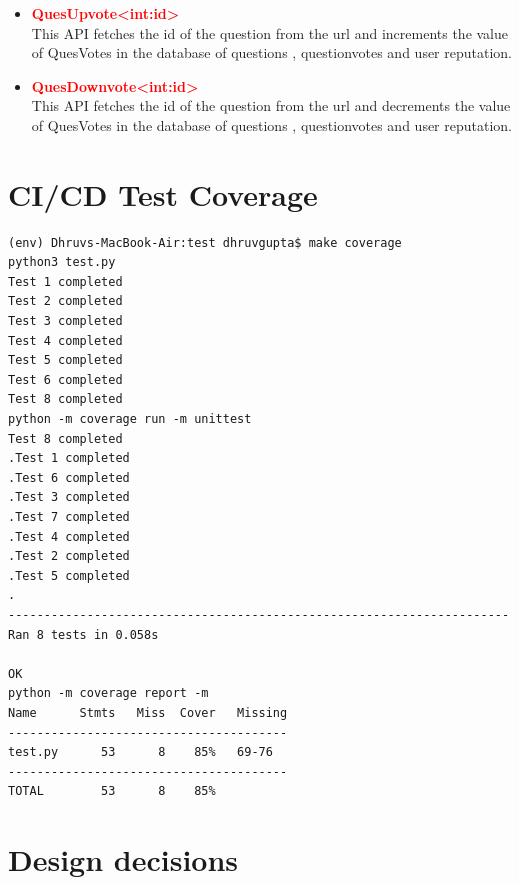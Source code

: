\documentclass{article}
\begin{document}
\begin{itemize}
\begin{itemize}
        \item \textcolor{red}{\textbf{\textfractionsolidus QuesUpvote\textfractionsolidus \textless int:id\textgreater }} \\ This API fetches the id of the question from the url and increments the value of QuesVotes in the database of questions , questionvotes and user reputation.
        \item \textcolor{red}{\textbf{\textfractionsolidus QuesDownvote\textfractionsolidus \textless int:id\textgreater }} \\ This API fetches the id of the question from the url and decrements the value of QuesVotes in the database of questions , questionvotes and user reputation.
    \end{itemize}
    
    
\end{itemize}
\section{CI/CD Test Coverage}
\begin{lstlisting}
(env) Dhruvs-MacBook-Air:test dhruvgupta$ make coverage
python3 test.py
Test 1 completed
Test 2 completed
Test 3 completed
Test 4 completed
Test 5 completed
Test 6 completed
Test 8 completed
python -m coverage run -m unittest
Test 8 completed
.Test 1 completed
.Test 6 completed
.Test 3 completed
.Test 7 completed
.Test 4 completed
.Test 2 completed
.Test 5 completed
.
----------------------------------------------------------------------
Ran 8 tests in 0.058s

OK
python -m coverage report -m
Name      Stmts   Miss  Cover   Missing
---------------------------------------
test.py      53      8    85%   69-76
---------------------------------------
TOTAL        53      8    85%
\end{lstlisting}

\section{Design decisions}
\end{document}
